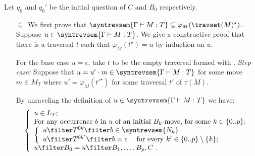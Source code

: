 \begin{itemize}[$\bullet$]
    Let $q_0$ and $q_0'$ be the initial
    question of $C$ and $B_0$ respectively.

\begin{enumerate}
\item[$\subseteq$]
    We first prove that $\syntrevsem{\Gamma \vdash M : T}
    \subseteq \varphi_{M}( \travset(M)^\star )$. Suppose $u
    \in \syntrevsem{\Gamma \vdash M : T}$. We give a
    constructive proof that there is a traversal $t$
    such that $\varphi_M(t^\star) = u$ by induction on
    $u$.

    For the base case $u=\epsilon$, take $t$ to be the empty traversal formed with .
    \emph{Step case:} Suppose that $u = u' \cdot m \in
    \syntrevsem{\Gamma \vdash M : T}$ for some move $m \in
    M_T$ where $u' = \varphi_M(t'^\star)$ for some traversal
    $t'$ of $\tau(M)$.

    By unraveling the definition of $u \in \syntrevsem{\Gamma \vdash M : T}$ we have:
    \begin{equation}
    \left\{
    \begin{array}{ll}
        u \in L_T ;  \\
        \hbox{For any occurrence $b$ in $u$ of an initial $B_k$-move, for some $k \in \{0..p\}$:} \\
        \left\{\begin{array}{ll}
            u \filter T^{0k} \filter b  \in \syntrevsem{N_k} \\
            u \filter T^{0k'} \filter b  = \epsilon \quad \mbox{ for every } k'\in \{0..p\}\setminus\{k\};
        \end{array}
        \right. \\
        u \filter B_0 = u \filter B_1, \ldots, B_p, C \ .
    \end{array}
    \right.
      \label{eqn:u_in_app_intersem}
    \end{equation}


\end{enumerate}
\end{itemize}
